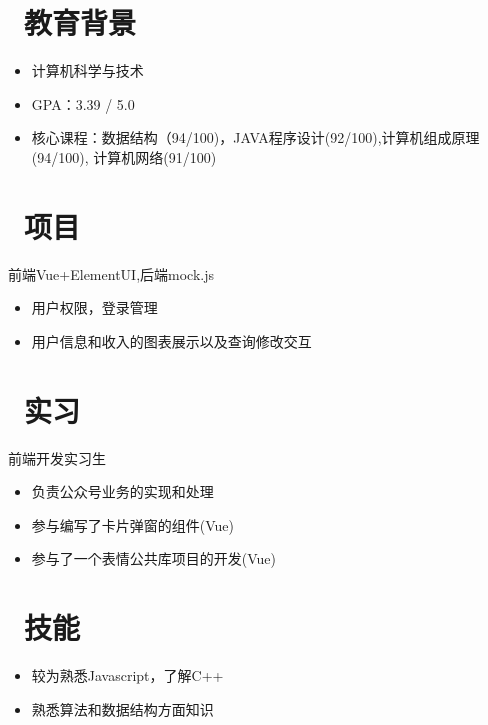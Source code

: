 \documentclass{resume}
\begin{document}


\section{\faGraduationCap\  教育背景}
\begin{itemize}
  \item 计算机科学与技术 
  \item GPA：3.39 / 5.0
  \item 核心课程：数据结构（94/100)，JAVA程序设计(92/100),计算机组成原理(94/100),
        计算机网络(91/100)
\end{itemize}

\section{\faUsers\ 项目}
前端Vue+ElementUI,后端mock.js
\begin{itemize}
  \item 用户权限，登录管理
  \item 用户信息和收入的图表展示以及查询修改交互
\end{itemize}

\section{\faUsers\ 实习}
前端开发实习生
\begin{itemize}
  \item 负责公众号业务的实现和处理
  \item 参与编写了卡片弹窗的组件(Vue)
  \item 参与了一个表情公共库项目的开发(Vue)
\end{itemize}



\section{\faCogs\ 技能}
\begin{itemize}[parsep=0.5ex]
  \item 较为熟悉Javascript，了解C++
  \item 熟悉算法和数据结构方面知识
\end{itemize}
\end{document}
